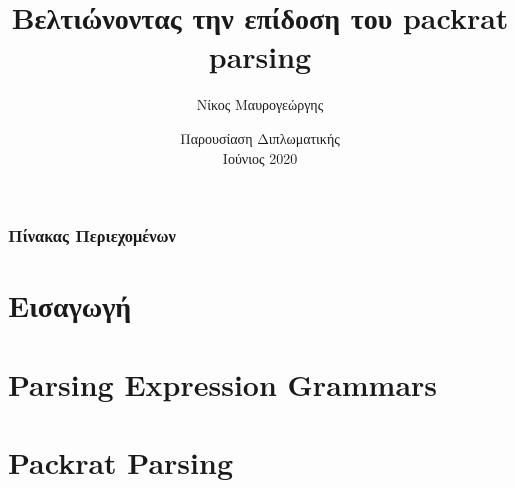 \documentclass{beamer}
\title[Βελτιώνοντας την επίδοση του packrat parsing] %
{Βελτιώνοντας την επίδοση του packrat parsing}
\author[Νίκος, Μαυρογεώργης] %
{Νίκος Μαυρογεώργης}
\institute[ECE, NTUA] %
{
  Σχολή Ηλεκτρολόγων Μηχανικών και Μηχανικών Υπολογιστών\\
  Εθνικό Μετσόβειο Πολυτεχνείο
}
\date[NTUA 2020] %
{Παρουσίαση Διπλωματικής \\ Ιούνιος 2020}
\begin{document}
\frame{\titlepage}

\begin{frame}
\frametitle{Πίνακας Περιεχομένων}
\tableofcontents
\end{frame}

\section{Εισαγωγή}

\begin{frame}
  \frametitle{}
\end{frame}

\begin{frame}
  \frametitle{}
\end{frame}

\begin{frame}
  \frametitle{}
\end{frame}

\section{Parsing Expression Grammars}

\begin{frame}
  \frametitle{}
\end{frame}

\begin{frame}
  \frametitle{}
\end{frame}

\begin{frame}
  \frametitle{}
\end{frame}

\begin{frame}
  \frametitle{}
\end{frame}

\section{Packrat Parsing}

\begin{frame}
  \frametitle{}
\end{frame}

\begin{frame}
  \frametitle{}
\end{frame}

\begin{frame}
  \frametitle{}
\end{frame}

\begin{frame}
  \frametitle{}
\end{frame}
\end{document}

